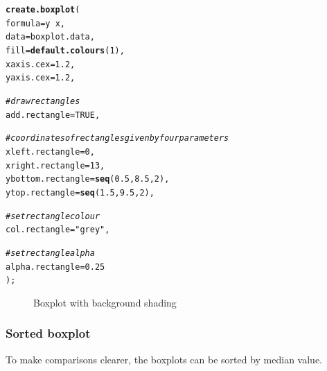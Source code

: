 \documentclass[letterpaper]{article}\usepackage[]{graphicx}\usepackage[]{color}
\makeatletter
\newcommand{\hlnum}[1]{\textcolor[rgb]{0.686,0.059,0.569}{#1}}%
\newcommand{\hlstr}[1]{\textcolor[rgb]{0.192,0.494,0.8}{#1}}%
\newcommand{\hlcom}[1]{\textcolor[rgb]{0.678,0.584,0.686}{\textit{#1}}}%
\newcommand{\hlopt}[1]{\textcolor[rgb]{0,0,0}{#1}}%
\newcommand{\hlstd}[1]{\textcolor[rgb]{0.345,0.345,0.345}{#1}}%
\newcommand{\hlkwc}[1]{\textcolor[rgb]{0.333,0.667,0.333}{#1}}%
\newcommand{\hlkwd}[1]{\textcolor[rgb]{0.737,0.353,0.396}{\textbf{#1}}}%
\newenvironment{kframe}{%
 \def\at@end@of@kframe{}%
 \ifinner\ifhmode%
  \def\at@end@of@kframe{\end{minipage}}%
  \begin{minipage}{\columnwidth}%
 \fi\fi%
 \def\FrameCommand##1{\hskip\@totalleftmargin \hskip-\fboxsep
 \colorbox{shadecolor}{##1}\hskip-\fboxsep
     \hskip-\linewidth \hskip-\@totalleftmargin \hskip\columnwidth}%
 \MakeFramed {\advance\hsize-\width
   \@totalleftmargin\z@ \linewidth\hsize
   \@setminipage}}%
 {\par\unskip\endMakeFramed%
 \at@end@of@kframe}
\newenvironment{knitrout}{}{} %
\makeatother
\begin{document}
\begin{knitrout}
\color{fgcolor}\begin{kframe}
\begin{alltt}
\hlkwd{create.boxplot}\hlstd{(}
    \hlkwc{formula} \hlstd{= y} \hlopt{~} \hlstd{x,}
    \hlkwc{data} \hlstd{= boxplot.data,}
    \hlkwc{fill} \hlstd{=} \hlkwd{default.colours}\hlstd{(}\hlnum{1}\hlstd{),}
    \hlkwc{xaxis.cex} \hlstd{=} \hlnum{1.2}\hlstd{,}
    \hlkwc{yaxis.cex} \hlstd{=} \hlnum{1.2}\hlstd{,}

    \hlcom{# draw rectangles}
    \hlkwc{add.rectangle} \hlstd{=} \hlnum{TRUE}\hlstd{,}

    \hlcom{# coordinates of rectangles given by four parameters}
    \hlkwc{xleft.rectangle} \hlstd{=} \hlnum{0}\hlstd{,}
    \hlkwc{xright.rectangle} \hlstd{=} \hlnum{13}\hlstd{,}
    \hlkwc{ybottom.rectangle} \hlstd{=} \hlkwd{seq}\hlstd{(}\hlnum{0.5}\hlstd{,} \hlnum{8.5}\hlstd{,} \hlnum{2}\hlstd{),}
    \hlkwc{ytop.rectangle} \hlstd{=} \hlkwd{seq}\hlstd{(}\hlnum{1.5}\hlstd{,} \hlnum{9.5}\hlstd{,} \hlnum{2}\hlstd{),}

    \hlcom{# set rectangle colour}
    \hlkwc{col.rectangle} \hlstd{=} \hlstr{"grey"}\hlstd{,}

    \hlcom{# set rectangle alpha}
    \hlkwc{alpha.rectangle} \hlstd{=} \hlnum{0.25}
    \hlstd{);}
\end{alltt}
\end{kframe}\begin{figure}

{\centering {} 

}

\caption[Boxplot with background shading]{Boxplot with background shading\label{fig:boxplot3}}
\end{figure}


\end{knitrout}

\subsubsection{Sorted boxplot}
To make comparisons clearer, the boxplots can be sorted by median value.
\end{document}
